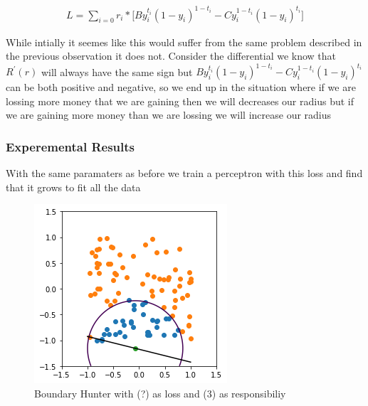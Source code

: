 \documentclass{article}
\begin{document}
\begin{align}
L = \sum_{i=0} r_i * \big[ By_i^{t_i}(1-y_i)^{1-t_i} - Cy_i^{1-t_i}(1-y_i)^{t_i} \big] 
\end{align}

While intially it seemes like this would suffer from the same problem described in the previous observation it does not. Consider the differential we know that $R^{'}(r)$ will always have the same sign but $By_i^{t_i}(1-y_i)^{1-t_i} - Cy_i^{1-t_i}(1-y_i)^{t_i}$ can be both positive and negative, so we end up in the situation where if we are lossing more money that we are gaining then we will decreases our radius but if we are gaining more money than we are lossing we will increase our radius

\subsubsection{Experemental Results}

With the same paramaters as before we train a perceptron with this loss and find that it grows to fit all the data

\begin{figure}[H]
\centering
  \begin{minipage}[b]{0.4\textwidth}
    \includegraphics[width=\textwidth]{BoundaryHunter-Attempt3-R2.png}
    \caption{Boundary Hunter with (?) as loss and (3) as responsibiliy}
  \end{minipage}
  \hfill
\end{figure}
\end{document}

